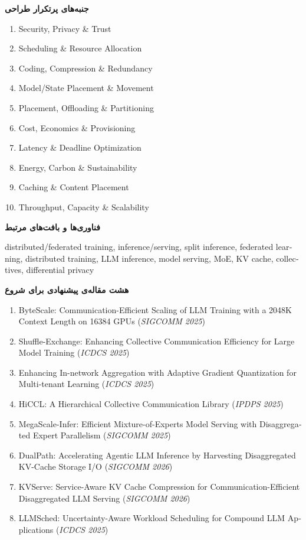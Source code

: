 \documentclass[12pt]{article}
\newcommand{\projectarea}[4]{%
\clearpage
\begin{tcolorbox}[
    colback=black!2,
    colframe=black!40,
    boxrule=0.5pt,
    arc=1mm,
    left=3mm,right=3mm,top=2mm,bottom=2mm,
    before skip=8pt,after skip=8pt
]
\linespread{1.08}\selectfont
\begin{latin}
\noindent{\large\bfseries #1}\par
\end{latin}
\smallskip
\textbf{جنبه‌های پرتکرار طراحی}\par
\vspace{1mm}
\begin{latin}
\small\raggedright
\begin{enumerate}[leftmargin=*,nosep,label=\arabic*.]
#2
\end{enumerate}
\end{latin}
\smallskip
\textbf{فناوری‌ها و بافت‌های مرتبط}\par
\begin{latin}
\small\raggedright #3\par
\end{latin}
\smallskip
\textbf{هشت مقاله‌ی پیشنهادی برای شروع}\par
\begin{latin}
\small\raggedright
\begin{enumerate}[leftmargin=*,nosep,label=\arabic*.]
#4
\end{enumerate}
\end{latin}
\end{tcolorbox}
}
\begin{document}
\projectarea{Distributed AI \& LLM Systems}{
    \item Security, Privacy \& Trust
    \item Scheduling \& Resource Allocation
    \item Coding, Compression \& Redundancy
    \item Model/State Placement \& Movement
    \item Placement, Offloading \& Partitioning
    \item Cost, Economics \& Provisioning
    \item Latency \& Deadline Optimization
    \item Energy, Carbon \& Sustainability
    \item Caching \& Content Placement
    \item Throughput, Capacity \& Scalability
}{distributed/federated training, inference/serving, split inference, federated learning, distributed training, LLM inference, model serving, MoE, KV cache, collectives, differential privacy}{
\item ByteScale: Communication-Efficient Scaling of LLM Training with a 2048K Context Length on 16384 GPUs (\textit{SIGCOMM 2025})
\item Shuffle-Exchange: Enhancing Collective Communication Efficiency for Large Model Training (\textit{ICDCS 2025})
\item Enhancing In-network Aggregation with Adaptive Gradient Quantization for Multi-tenant Learning (\textit{ICDCS 2025})
\item HiCCL: A Hierarchical Collective Communication Library (\textit{IPDPS 2025})
\item MegaScale-Infer: Efficient Mixture-of-Experts Model Serving with Disaggregated Expert Parallelism (\textit{SIGCOMM 2025})
\item DualPath: Accelerating Agentic LLM Inference by Harvesting Disaggregated KV-Cache Storage I/O (\textit{SIGCOMM 2026})
\item KVServe: Service-Aware KV Cache Compression for Communication-Efficient Disaggregated LLM Serving (\textit{SIGCOMM 2026})
\item LLMSched: Uncertainty-Aware Workload Scheduling for Compound LLM Applications (\textit{ICDCS 2025})
}
\end{document}
